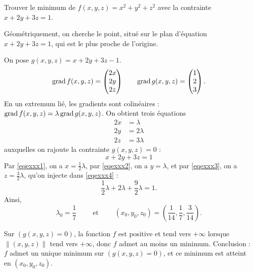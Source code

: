 \documentclass[11pt, class=report,crop=false]{standalone}
\begin{document}
\begin{exemple}
Trouver le minimum de $f(x,y,z) = x^2 + y^2 + z^2$ avec la contrainte $x + 2y +3z = 1$.


Géométriquement, on cherche le point, situé sur le plan d'équation $x + 2y +3z = 1$, qui est le plus proche de l'origine.


On pose $g(x,y,z) = x + 2y +3z - 1$.
$$\operatorname{grad} f(x,y,z) = \begin{pmatrix} 2x \\ 2y \\ 2z \end{pmatrix}
\qquad \operatorname{grad} g(x,y,z) = \begin{pmatrix} 1 \\ 2 \\ 3 \end{pmatrix}.$$
En un extremum lié, les gradients sont colinéaires : $\operatorname{grad} f(x,y,z) = \lambda \operatorname{grad} g(x,y,z)$.
On obtient trois équations
\setcounter{equation}{0}
\begin{align}
2x &= \lambda \label{eqexxx1}\\
2y &= 2\lambda \label{eqexxx2}\\
2z &= 3\lambda \label{eqexxx3}
\end{align}
auxquelles on rajoute la contrainte $g(x,y,z) = 0$ :
\begin{equation}
x + 2y +3z = 1
\label{eqexxx4}
\end{equation}
Par \eqref{eqexxx1}, on a $x = \frac12\lambda$, par \eqref{eqexxx2}, on a $y = \lambda$, et par \eqref{eqexxx3}, on a $z = \frac32\lambda$, qu'on injecte dans \eqref{eqexxx4} :
$$\frac12\lambda + 2\lambda + \frac92\lambda = 1.$$
Ainsi, 
$$\lambda_0 = \frac{1}{7} \qquad \text{ et } \qquad (x_0,y_0,z_0) = \left( \frac{1}{14},  \frac{1}{7}, \frac{3}{14} \right).$$

Sur $(g(x,y,z)=0)$, la fonction $f$ est positive et tend vers $+\infty$ lorsque $\|(x,y,z)\|$ tend vers $+\infty$, donc $f$ admet au moins un minimum.
Conclusion : $f$ admet un unique minimum sur $(g(x,y,z)=0)$, et ce minimum est atteint en $(x_0,y_0,z_0)$.
\end{exemple}
\end{document}
